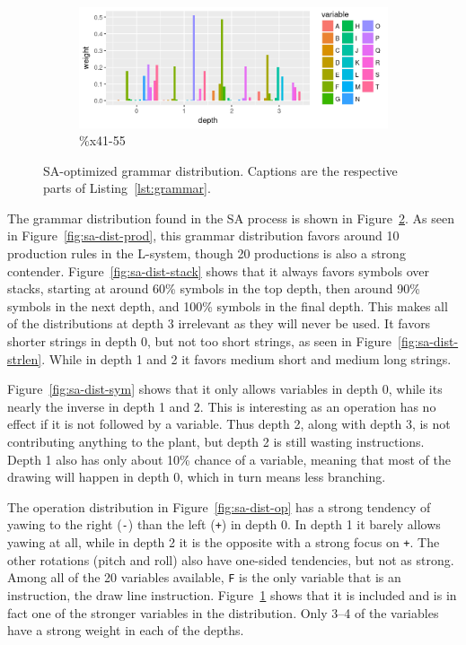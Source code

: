 \begin{figure}
    \ContinuedFloat
    \begin{subfigure}{0.98\textwidth}
        \includegraphics[width=\textwidth]{figures/sa-dist-var}
        \caption{\%x41-55}
        \label{fig:sa-dist-var}
    \end{subfigure}
    \caption[SA-optimized grammar distribution]{\gls{SA}-optimized grammar distribution. Captions are the respective parts of Listing~\ref{lst:grammar}.}
    \label{fig:sa-dist}
\end{figure}

The grammar distribution found in the SA process is shown in Figure~\ref{fig:sa-dist}.
As seen in Figure~\ref{fig:sa-dist-prod}, this grammar distribution favors around 10 production rules in the \gls{L-system}, though 20 productions is also a strong contender.
Figure~\ref{fig:sa-dist-stack} shows that it always favors symbols over stacks, starting at around 60\% symbols in the top depth, then around 90\% symbols in the next depth, and 100\% symbols in the final depth.
This makes all of the distributions at depth 3 irrelevant as they will never be used.
It favors shorter strings in depth 0, but not too short strings, as seen in Figure~\ref{fig:sa-dist-strlen}.
While in depth 1 and 2 it favors medium short and medium long strings.

Figure~\ref{fig:sa-dist-sym} shows that it only allows variables in depth 0, while its nearly the inverse in depth 1 and 2.
This is interesting as an operation has no effect if it is not followed by a variable.
Thus depth 2, along with depth 3, is not contributing anything to the plant, but depth 2 is still wasting instructions.
Depth 1 also has only about 10\% chance of a variable, meaning that most of the drawing will happen in depth 0, which in turn means less branching.

The operation distribution in Figure~\ref{fig:sa-dist-op} has a strong tendency of yawing to the right (\texttt{-}) than the left (\texttt{+}) in depth 0.
In depth 1 it barely allows yawing at all, while in depth 2 it is the opposite with a strong focus on \texttt{+}.
The other rotations (pitch and roll) also have one-sided tendencies, but not as strong.
Among all of the 20 variables available, \texttt{F} is the only variable that is an instruction, the draw line instruction.
Figure~\ref{fig:sa-dist-var} shows that it is included and is in fact one of the stronger variables in the distribution.
Only 3--4 of the variables have a strong weight in each of the depths.

